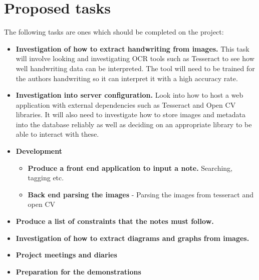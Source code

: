 \documentclass[11pt,fleqn,twoside]{article}
\begin{document}
\section{Proposed tasks}
The following tasks are ones which should be completed on the project:
\begin{itemize}

\item \textbf{Investigation of how to extract handwriting from images.} This task will involve looking and investigating OCR tools such as Tesseract to see how well handwriting data can be interpreted. The tool will need to be trained for the authors handwriting so it can interpret it with a high accuracy rate.

\item \textbf{Investigation into server configuration.} Look into how to host a web application with external dependencies such as Tesseract and Open CV libraries. It will also need to investigate how to store images and metadata into the database reliably as well as deciding on an appropriate library to be able to interact with these.

\item \textbf{Development}
  \begin{itemize}

    \item \textbf{Produce a front end application to input a note.} Searching, tagging etc.

    \item \textbf{Back end parsing the images} - Parsing the images from tesseract and open CV

  \end{itemize}

\item \textbf{Produce a list of constraints that the notes must follow.}

\item \textbf{Investigation of how to extract diagrams and graphs from images.}

\item \textbf{Project meetings and diaries}

\item \textbf{Preparation for the demonstrations}

\end{itemize}

\end{document}
